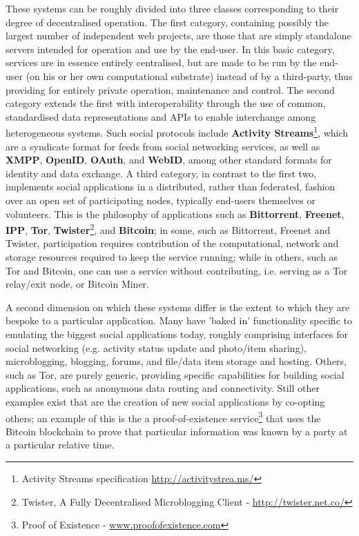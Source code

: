 \documentclass{sig-alternate}
\begin{document}
These systems can be roughly divided into three classes corresponding to their degree of decentralised operation.  The first category, containing possibly the largest number of independent web projects, are those that are simply standalone servers intended for operation and use by the end-user.  In this basic category, services are in essence entirely centralised, but are made to be run by the end-user (on his or her own computational substrate) instead of by a third-party, thus providing for entirely private operation, maintenance and control.  The second category extends the first with interoperability through the use of common, standardised data representations and APIs to enable interchange among heterogeneous systems.  Such social protocols include \textbf{Activity Streams}\footnote{Activity Streams specification \url{http://activitystrea.ms/}}, which are a syndicate format for feeds from social networking services, as well as \textbf{XMPP}, \textbf{OpenID}, \textbf{OAuth}, and \textbf{WebID}, among other standard formats for identity and data exchange.  A third category, in contrast to the first two, implements social applications in a distributed, rather than federated, fashion over an open set of participating nodes, typically end-users themselves or volunteers.  This is the philosophy of applications such as \textbf{Bittorrent}, \textbf{Freenet}, \textbf{IPP}, \textbf{Tor}, \textbf{Twister}\footnote{Twister, A Fully Decentralised Microblogging Client - \url{http://twister.net.co/}}, and \textbf{Bitcoin}; in some, such as Bittorrent, Freenet and Twister, participation requires contribution of the computational, network and storage resources required to keep the service running; while in others, such as Tor and Bitcoin, one can use a service without contributing, i.e. serving as a Tor relay/exit node, or Bitcoin Miner.

A second dimension on which these systems differ is the extent to which they are bespoke to a particular application.  Many have 'baked in' functionality specific to emulating the biggest social applications today, roughly comprising interfaces for social networking (e.g. activity status update and photo/item sharing), microblogging, blogging, forums, and file/data item storage and hosting.  Others, such as Tor, are purely generic, providing specific capabilities for building social applications, such as  anonymous data routing and connectivity.  Still other examples exist that are the creation of new social applications by co-opting others; an example of this  is the a proof-of-existence service\footnote{Proof of Existence - \url{www.proofofexistence.com}} that uses the Bitcoin blockchain to prove that particular information was known by a party at a particular relative time.
\end{document}
